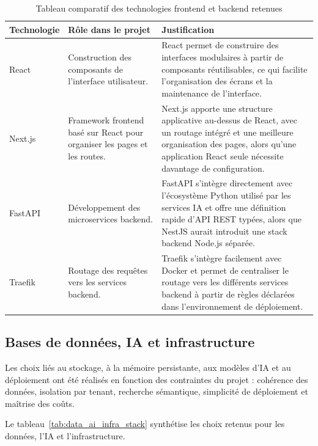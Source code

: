 \begin{table}[H]
\centering
\small
\renewcommand{\arraystretch}{1.25}
\caption{Tableau comparatif des technologies frontend et backend retenues}
\label{tab:frontend_backend_stack}
\begin{tabularx}{\textwidth}{|p{2.8cm}|p{4.2cm}|X|}
\hline
\textbf{Technologie} & \textbf{Rôle dans le projet} & \textbf{Justification} \\
\hline
React & Construction des composants de l'interface utilisateur. & React permet de construire des interfaces modulaires à partir de composants réutilisables, ce qui facilite l'organisation des écrans et la maintenance de l'interface. \\
\hline
Next.js & Framework frontend basé sur React pour organiser les pages et les routes. & Next.js apporte une structure applicative au-dessus de React, avec un routage intégré et une meilleure organisation des pages, alors qu'une application React seule nécessite davantage de configuration. \\
\hline
FastAPI & Développement des microservices backend. & FastAPI s'intègre directement avec l'écosystème Python utilisé par les services IA et offre une définition rapide d'API REST typées, alors que NestJS aurait introduit une stack backend Node.js séparée. \\
\hline
Traefik & Routage des requêtes vers les services backend. & Traefik s'intègre facilement avec Docker et permet de centraliser le routage vers les différents services backend à partir de règles déclarées dans l'environnement de déploiement. \\
\hline
\end{tabularx}
\end{table}

\subsection{Bases de données, IA et infrastructure}

Les choix liés au stockage, à la mémoire persistante, aux modèles d'IA et au déploiement ont
été réalisés en fonction des contraintes du projet : cohérence des données, isolation par tenant,
recherche sémantique, simplicité de déploiement et maîtrise des coûts.

Le tableau~\ref{tab:data_ai_infra_stack} synthétise les choix retenus pour les données, l'IA
et l'infrastructure.

